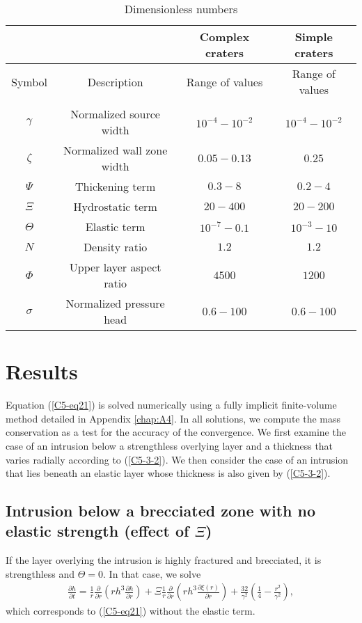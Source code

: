 \begin{table}[h!]
  \caption{Dimensionless numbers}
  \centering
  \begin{tabular}{c|c|c|c}
    &&Complex craters&Simple craters \\
    \hline
    Symbol& Description & Range of values & Range of values \\
    \hline
    &&\\
    $\gamma$&Normalized source width& $10^{-4}-10^{-2}$ &$10^{-4}-10^{-2}$ \\
    $\zeta$& Normalized wall zone width  & $0.05-0.13$&$0.25$\\
    $\Psi$&Thickening term & $0.3-8$&$0.2-4$\\
    $\Xi$& Hydrostatic term & $20-400$&$20-200$\\
    $\Theta$ &Elastic term & $10^{-7}-0.1$&$10^{-3}-10$\\
    $N$ & Density ratio & $1.2$ &$1.2$\\
    $\Phi$ & Upper layer aspect ratio & $4500$ &$1200 $\\
    $\sigma$&Normalized pressure head& $0.6-100$ & $0.6-100$ 
                                                   \label{C5-tab3}
  \end{tabular} 
\end{table}
	 
	
\section{Results}
	
Equation (\ref{C5-eq21}) is solved  numerically using a fully implicit
finite-volume  method  detailed  in Appendix  \ref{chap:A4}.   In  all
solutions, we compute the mass conservation as a test for the accuracy
of the convergence. We first examine  the case of an intrusion below a
strengthless  overlying layer  and  a thickness  that varies  radially
according to (\ref{C5-3-2}). We then consider the case of an intrusion
that lies  beneath an elastic layer  whose thickness is also  given by
(\ref{C5-3-2}).
	
\subsection{Intrusion below a brecciated zone with no elastic strength
  (effect of $\Xi$)}
\label{C5-Strengthless_Layer1}
If  the  layer  overlying  the   intrusion  is  highly  fractured  and
brecciated, it is strengthless and $\Theta=0$.  In that case, we solve
\begin{eqnarray}
  \label{C5-eq22}
  \frac{\partial h}{\partial t}=\frac{1}{r} \frac{\partial}{\partial r}\left (rh^{3} \frac{\partial h}{\partial r} \right)+ \Xi \frac{1}{r} \frac{\partial}{\partial r}\left ( rh^{3}\frac{\partial \xi(r)}{\partial r}\right )+\frac{32}{\gamma^{2}} \left(\frac{1}{4}-\frac{r^{2}}{\gamma^{2}}\right),
\end{eqnarray}
which corresponds to (\ref{C5-eq21}) without the elastic term.

